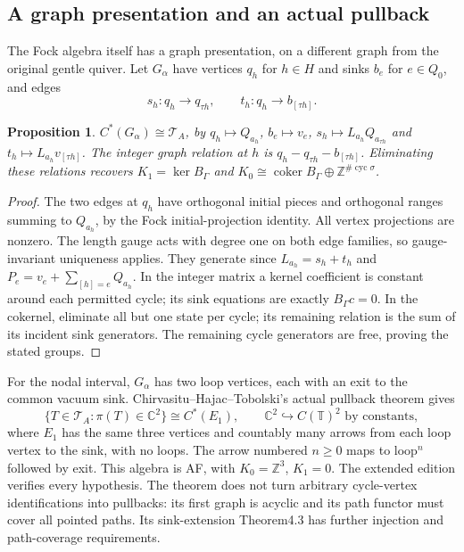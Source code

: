 \documentclass[11pt]{article}
\newtheorem{proposition}[theorem]{Proposition}
\theoremstyle{definition}\newtheorem{definition}[theorem]{Definition}
\theoremstyle{remark}\newtheorem{remark}[theorem]{Remark}
\newcommand{\C}{\mathbb C}\newcommand{\Z}{\mathbb Z}\newcommand{\R}{\mathbb R}
\begin{document}
\subsection{A graph presentation and an actual pullback}
The Fock algebra itself has a graph presentation, on a different graph from the original gentle quiver. Let $G_\alpha$ have vertices $q_h$ for $h\in H$ and sinks $b_e$ for $e\in Q_0$, and edges
\[
 s_h:q_h\to q_{\tau h},\qquad t_h:q_h\to b_{[\tau h]}.
\]
\begin{proposition}\label{thm:graphmodel}
$C^*(G_\alpha)\cong\mathcal T_A$, by $q_h\mapsto Q_{a_h}$, $b_e\mapsto v_e$, $s_h\mapsto L_{a_h}Q_{a_{\tau h}}$ and $t_h\mapsto L_{a_h}v_{[\tau h]}$. The integer graph relation at $h$ is $q_h-q_{\tau h}-b_{[\tau h]}$. Eliminating these relations recovers $K_1=\ker B_\Gamma$ and $K_0\cong\operatorname{coker}B_\Gamma\oplus\Z^{\#\operatorname{cyc}\sigma}$.
\end{proposition}
\begin{proof}
The two edges at $q_h$ have orthogonal initial pieces and orthogonal ranges summing to $Q_{a_h}$, by the Fock initial-projection identity. All vertex projections are nonzero. The length gauge acts with degree one on both edge families, so gauge-invariant uniqueness applies. They generate since $L_{a_h}=s_h+t_h$ and $P_e=v_e+\sum_{[h]=e}Q_{a_h}$. In the integer matrix a kernel coefficient is constant around each permitted cycle; its sink equations are exactly $B_\Gamma c=0$. In the cokernel, eliminate all but one state per cycle; its remaining relation is the sum of its incident sink generators. The remaining cycle generators are free, proving the stated groups.
\end{proof}
For the nodal interval, $G_\alpha$ has two loop vertices, each with an exit to the common vacuum sink. Chirvasitu--Hajac--Tobolski's actual pullback theorem \cite[Theorem3.4]{GraphPullbacks} gives
\[
 \{T\in\mathcal T_A:\pi(T)\in\C^2\}
 \cong C^*(E_1),\qquad \C^2\hookrightarrow C(\mathbb T)^2\text{ by constants},
\]
where $E_1$ has the same three vertices and countably many arrows from each loop vertex to the sink, with no loops. The arrow numbered $n\ge0$ maps to loop$^n$ followed by exit. This algebra is AF, with $K_0=\Z^3$, $K_1=0$. The extended edition verifies every hypothesis. The theorem does not turn arbitrary cycle-vertex identifications into pullbacks: its first graph is acyclic and its path functor must cover all pointed paths. Its sink-extension Theorem4.3 has further injection and path-coverage requirements.
\end{document}
